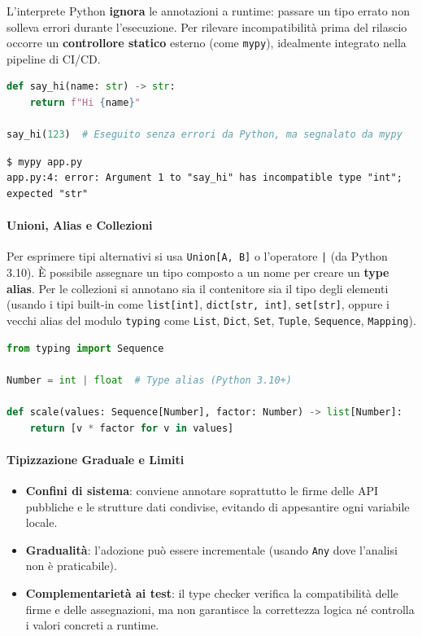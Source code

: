 \documentclass[12pt]{extarticle}
\begin{document}
L'interprete Python \textbf{ignora} le annotazioni a runtime: passare un tipo errato non solleva errori durante l'esecuzione. Per rilevare incompatibilità prima del rilascio occorre un \textbf{controllore statico} esterno (come \texttt{mypy}), idealmente integrato nella pipeline di CI/CD.

\begin{lstlisting}[language=Python]
def say_hi(name: str) -> str:
    return f"Hi {name}"

say_hi(123)  # Eseguito senza errori da Python, ma segnalato da mypy
\end{lstlisting}

\begin{lstlisting}[numbers=none]
$ mypy app.py
app.py:4: error: Argument 1 to "say_hi" has incompatible type "int"; expected "str"
\end{lstlisting}

\paragraph{Unioni, Alias e Collezioni}
Per esprimere tipi alternativi si usa \texttt{Union[A, B]} o l'operatore \texttt{|} (da Python 3.10). È possibile assegnare un tipo composto a un nome per creare un \textbf{type alias}. Per le collezioni si annotano sia il contenitore sia il tipo degli elementi (usando i tipi built-in come \texttt{list[int]}, \texttt{dict[str, int]}, \texttt{set[str]}, oppure i vecchi alias del modulo \texttt{typing} come \texttt{List}, \texttt{Dict}, \texttt{Set}, \texttt{Tuple}, \texttt{Sequence}, \texttt{Mapping}).

\begin{lstlisting}[language=Python]
from typing import Sequence

Number = int | float  # Type alias (Python 3.10+)

def scale(values: Sequence[Number], factor: Number) -> list[Number]:
    return [v * factor for v in values]
\end{lstlisting}

\paragraph{Tipizzazione Graduale e Limiti}
\begin{itemize}
\item \textbf{Confini di sistema}: conviene annotare soprattutto le firme delle API pubbliche e le strutture dati condivise, evitando di appesantire ogni variabile locale.
\item \textbf{Gradualità}: l'adozione può essere incrementale (usando \texttt{Any} dove l'analisi non è praticabile).
\item \textbf{Complementarietà ai test}: il type checker verifica la compatibilità delle firme e delle assegnazioni, ma non garantisce la correttezza logica né controlla i valori concreti a runtime.
\end{itemize}
\end{document}
